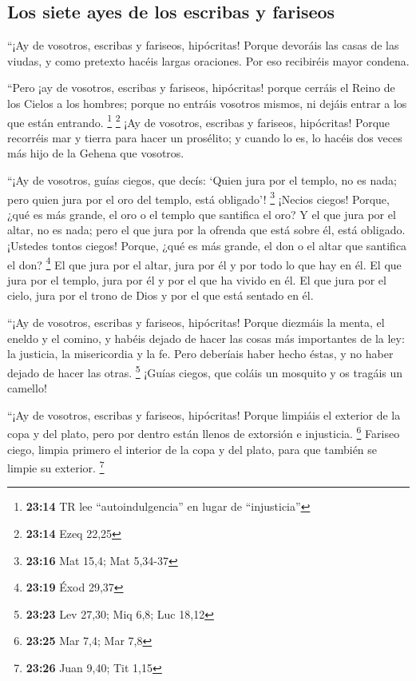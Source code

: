 \begin{paracol}{2}
{\subsection{Los siete ayes de los escribas y
fariseos}\label{los-siete-ayes-de-los-escribas-y-fariseos}}

 ``¡Ay de vosotros, escribas y fariseos, hipócritas!
Porque devoráis las casas de las viudas, y como pretexto hacéis largas
oraciones. Por eso recibiréis mayor condena.

 ``Pero ¡ay de vosotros, escribas y fariseos, hipócritas!
porque cerráis el Reino de los Cielos a los hombres; porque no entráis
vosotros mismos, ni dejáis entrar a los que están entrando. \footnote{\textbf{23:14}
  TR lee ``autoindulgencia'' en lugar de ``injusticia''} \footnote{\textbf{23:14}
  Ezeq 22,25}  ¡Ay de vosotros, escribas y fariseos,
hipócritas! Porque recorréis mar y tierra para hacer un prosélito; y
cuando lo es, lo hacéis dos veces más hijo de la Gehena que vosotros.

 ``¡Ay de vosotros, guías ciegos, que decís: `Quien jura
por el templo, no es nada; pero quien jura por el oro del templo, está
obligado'! \footnote{\textbf{23:16} Mat 15,4; Mat 5,34-37}
 ¡Necios ciegos! Porque, ¿qué es más grande, el oro o el
templo que santifica el oro?  Y el que jura por el altar,
no es nada; pero el que jura por la ofrenda que está sobre él, está
obligado.  ¡Ustedes tontos ciegos! Porque, ¿qué es más
grande, el don o el altar que santifica el don? \footnote{\textbf{23:19}
  Éxod 29,37}  El que jura por el altar, jura por él y
por todo lo que hay en él.  El que jura por el templo,
jura por él y por el que ha vivido en él.  El que jura
por el cielo, jura por el trono de Dios y por el que está sentado en él.

 ``¡Ay de vosotros, escribas y fariseos, hipócritas!
Porque diezmáis la menta, el eneldo y el comino, y habéis dejado de
hacer las cosas más importantes de la ley: la justicia, la misericordia
y la fe. Pero deberíais haber hecho éstas, y no haber dejado de hacer
las otras. \footnote{\textbf{23:23} Lev 27,30; Miq 6,8; Luc 18,12}
 ¡Guías ciegos, que coláis un mosquito y os tragáis un
camello!

 ``¡Ay de vosotros, escribas y fariseos, hipócritas!
Porque limpiáis el exterior de la copa y del plato, pero por dentro
están llenos de extorsión e injusticia. \footnote{\textbf{23:25} Mar
  7,4; Mar 7,8}  Fariseo ciego, limpia primero el
interior de la copa y del plato, para que también se limpie su exterior.
\footnote{\textbf{23:26} Juan 9,40; Tit 1,15}


\end{paracol}
